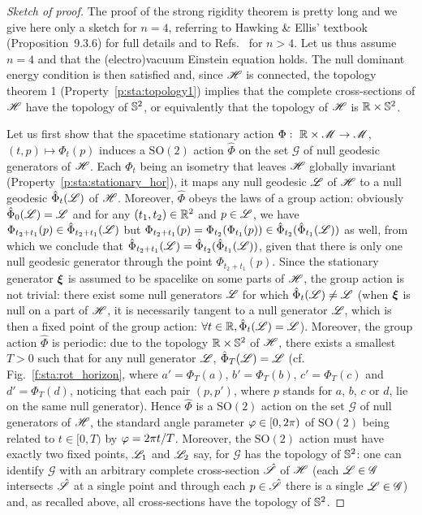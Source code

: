 \begin{proof}[Sketch of proof]
The proof of the strong rigidity theorem is pretty long and we
give here only a sketch for $n=4$, referring to Hawking \& Ellis' textbook~\cite{HawkiE73} (Proposition~9.3.6)
for full details and to Refs.~\cite{HollaIW07,HollaI12,MoncrI08}
for $n>4$.
Let us thus assume $n=4$ and that the (electro)vacuum Einstein equation holds.
The null dominant energy condition is then satisfied and, since
$\mathscr{H}$ is connected, the topology theorem 1 (Property~\ref{p:sta:topology1})
implies that the complete cross-sections of $\mathscr{H}$ have the topology of $\mathbb{S}^2$,
or equivalently that the topology of $\mathscr{H}$ is $\mathbb{R}\times\mathbb{S}^2$.

Let us first show that the
spacetime stationary action $\Phi:\  \mathbb{R}\times \mathscr{M} \to \mathscr{M}$, $(t,p) \mapsto \Phi_t(p)$
induces a $\mathrm{SO}(2)$ action $\hat{\Phi}$ on the set $\mathscr{G}$ of
null geodesic generators of $\mathscr{H}$.
Each $\Phi_t$ being an isometry that leaves $\mathscr{H}$ globally invariant (Property~\ref{p:sta:stationary_hor}), it maps
any null geodesic $\mathscr{L}$ of $\mathscr{H}$ to a null geodesic $\hat{\Phi}_t(\mathscr{L})$ of $\mathscr{H}$.
Moreover, $\hat{\Phi}$ obeys the laws of a group action:
obviously $\hat{\Phi}_0(\mathscr{L}) = \mathscr{L}$ and for any $(t_1, t_2)\in \mathbb{R}^2$
and $p\in\mathscr{L}$, we have
$\Phi_{t_2 + t_1}(p)\in\hat{\Phi}_{t_2+t_1}(\mathscr{L})$ but
$\Phi_{t_2 + t_1}(p) = \Phi_{t_2}(\Phi_{t_1}(p)) \in \hat{\Phi}_{t_2}(\hat{\Phi}_{t_1}(\mathscr{L}))$
as well,
from which we conclude that $\hat{\Phi}_{t_2+t_1}(\mathscr{L}) = \hat{\Phi}_{t_2}(\hat{\Phi}_{t_1}(\mathscr{L}))$,
given that there is only one null geodesic generator through the point $\Phi_{t_2 + t_1}(p)$.
Since the stationary generator $\bm{\xi}$ is assumed to be spacelike on some parts
of $\mathscr{H}$, the group action is not trivial: there exist some null generators $\mathscr{L}$ for which
$\hat{\Phi}_t(\mathscr{L})\neq \mathscr{L}$ (when $\bm{\xi}$ is null on a part of $\mathscr{H}$, it is necessarily
tangent to a null generator $\mathscr{L}$, which is then a fixed point of the group action:
$\forall t\in\mathbb{R}, \hat{\Phi}_t(\mathscr{L}) = \mathscr{L}$).
Moreover, the group action $\hat{\Phi}$ is periodic: due to the topology
$\mathbb{R}\times\mathbb{S}^2$ of $\mathscr{H}$,
there exists a smallest $T>0$
such that for any null generator $\mathscr{L}$, $\hat{\Phi}_T(\mathscr{L}) = \mathscr{L}$
(cf. Fig.~\ref{f:sta:rot_horizon}, where $a' = \Phi_T(a)$,
$b' = \Phi_T(b)$, $c' = \Phi_T(c)$ and $d' = \Phi_T(d)$, noticing that
each pair $(p,p')$, where $p$ stands for $a$, $b$, $c$ or $d$,
lie on the same null generator). Hence $\hat{\Phi}$ is
a $\mathrm{SO}(2)$ action on the set $\mathscr{G}$
of null generators of $\mathscr{H}$, the standard angle parameter $\varphi\in[0,2\pi)$ %
of $\mathrm{SO}(2)$ being related to $t\in [0,T)$ by $\varphi = 2\pi t / T$. %
Moreover, the $\mathrm{SO}(2)$ action must have exactly two fixed points,
$\mathscr{L}_1$ and $\mathscr{L}_2$ say,
for $\mathscr{G}$ has the topology of $\mathbb{S}^2$: one
can identify $\mathscr{G}$ with an arbitrary complete cross-section $\hat{\mathscr{S}}$
of $\mathscr{H}$ (each $\mathscr{L}\in\mathscr{G}$ intersects $\hat{\mathscr{S}}$ at a single
point and through each $p\in\hat{\mathscr{S}}$ there is a single $\mathscr{L}\in\mathscr{G}$)
and, as recalled above, all cross-sections have the topology of $\mathbb{S}^2$.


\end{proof}
